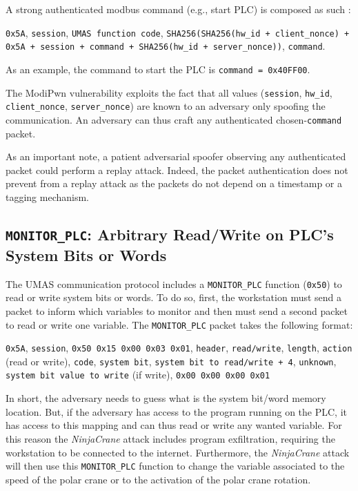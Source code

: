A strong authenticated modbus command (e.g., start PLC) is composed as such : 

\noindent \texttt{0x5A}, \texttt{session}, \texttt{UMAS function code}, \texttt{SHA256(SHA256(hw\_id + client\_nonce) + \texttt{0x5A} + \texttt{session} + command + SHA256(hw\_id + server\_nonce))}, \texttt{command}. 

As an example, the command to start the PLC is \texttt{command = 0x40FF00}.

The ModiPwn vulnerability exploits the fact that all values (\texttt{session}, \texttt{hw\_id}, \texttt{client\_nonce}, \texttt{server\_nonce}) are known to an adversary only spoofing the communication. An adversary can thus craft any authenticated chosen-\texttt{command} packet. 

As an important note, a patient adversarial spoofer observing any authenticated packet could perform a replay attack. Indeed, the packet authentication does not prevent from a replay attack as the packets do not depend on a timestamp or a tagging mechanism.

\subsection{\texttt{MONITOR\_PLC}: Arbitrary Read/Write on PLC's System Bits or Words}

The UMAS communication protocol includes a \texttt{MONITOR\_PLC} function (\texttt{0x50}) to read or write system bits or words. To do so, first, the workstation must send a packet to inform which variables to monitor and then must send a second packet to read or write one variable. The \texttt{MONITOR\_PLC} packet takes the following format:

\noindent \texttt{0x5A}, \texttt{session}, \texttt{0x50 0x15 0x00 0x03 0x01}, \texttt{header}, \texttt{read/write}, \texttt{length}, \texttt{action} (read or write), \texttt{code}, \texttt{system bit}, \texttt{system bit to read/write + 4}, \texttt{unknown}, \texttt{system bit value to write} (if write), \texttt{0x00 0x00 0x00 0x01}

In short, the adversary needs to guess what is the system bit/word memory location. But, if the adversary has access to the program running on the PLC, it has access to this mapping and can thus read or write any wanted variable. For this reason the \emph{NinjaCrane} attack includes program exfiltration, requiring the workstation to be connected to the internet. Furthermore, the \emph{NinjaCrane} attack will then use this \texttt{MONITOR\_PLC} function to change the variable associated to the speed of the polar crane or to the activation of the polar crane rotation.